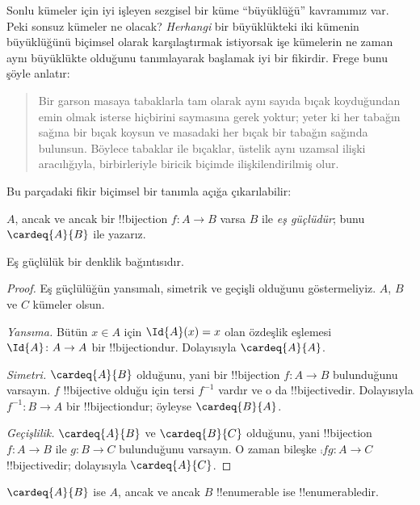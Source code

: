 \documentclass[../../../include/open-logic-section]{subfiles}
\begin{document}


Sonlu kümeler için iyi işleyen sezgisel bir küme ``büyüklüğü'' kavramımız
var. Peki sonsuz kümeler ne olacak? \emph{Herhangi} bir büyüklükteki iki
kümenin büyüklüğünü biçimsel olarak karşılaştırmak istiyorsak işe kümelerin
ne zaman aynı büyüklükte olduğunu tanımlayarak başlamak iyi bir fikirdir.
Frege bunu şöyle anlatır:
\begin{quote}
  Bir garson masaya tabaklarla tam olarak aynı sayıda bıçak koyduğundan emin
  olmak isterse hiçbirini saymasına gerek yoktur; yeter ki her tabağın sağına
  bir bıçak koysun ve masadaki her bıçak bir tabağın sağında bulunsun. Böylece
  tabaklar ile bıçaklar, üstelik aynı uzamsal ilişki aracılığıyla, birbirleriyle
  biricik biçimde ilişkilendirilmiş olur. \citep[\S70]{Frege1884}
\end{quote}
Bu parçadaki fikir biçimsel bir tanımla açığa çıkarılabilir:

\begin{defn}
  $A$, ancak ve ancak bir !!{bijection} $f\colon A\to B$ varsa $B$ ile
  \emph{eş güçlüdür}; bunu $\cardeq{A}{B}$ ile yazarız.
\end{defn}

\begin{prop}
Eş güçlülük bir denklik bağıntısıdır.
\end{prop}

\begin{proof}
Eş güçlülüğün yansımalı, simetrik ve geçişli olduğunu göstermeliyiz. $A$,
$B$ ve $C$ kümeler olsun.

\emph{Yansıma.} Bütün $x\in A$ için $\Id{A}(x)=x$ olan özdeşlik eşlemesi
$\Id{A}\colon A\to A$ bir !!{bijection}dur. Dolayısıyla $\cardeq{A}{A}$.

\emph{Simetri.} $\cardeq{A}{B}$ olduğunu, yani bir !!{bijection}
$f\colon A\to B$ bulunduğunu varsayın. $f$ !!{bijective} olduğu için tersi
$f^{-1}$ vardır ve o da !!{bijective}dir. Dolayısıyla $f^{-1}\colon B\to A$
bir !!{bijection}dur; öyleyse $\cardeq{B}{A}$.

\emph{Geçişlilik.} $\cardeq{A}{B}$ ve $\cardeq{B}{C}$ olduğunu, yani
!!{bijection} $f\colon A\to B$ ile $g\colon B\to C$ bulunduğunu varsayın.
O zaman bileşke $\comp{f}{g}\colon A\to C$ !!{bijective}dir; dolayısıyla
$\cardeq{A}{C}$.
\end{proof}

\begin{prop}
$\cardeq{A}{B}$ ise $A$, ancak ve ancak $B$ !!{enumerable} ise
!!{enumerable}dir.
\end{prop}
\end{document}
